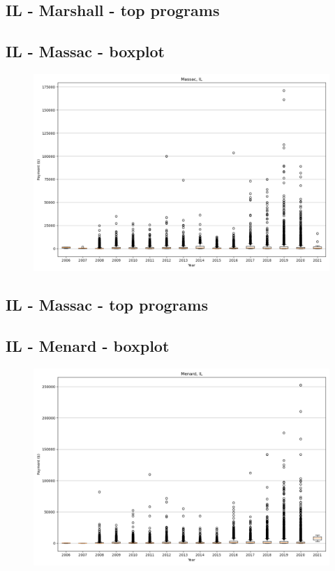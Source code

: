\subsection*{IL - Marshall - top programs}

\newpage
\subsection*{IL - Massac - boxplot}
\begin{figure}[h]
\centering
\includegraphics[width=7in]{../output/boxplots/counties/Massac-IL_boxplot.png}
\end{figure}


\subsection*{IL - Massac - top programs}

\newpage
\subsection*{IL - Menard - boxplot}
\begin{figure}[h]
\centering
\includegraphics[width=7in]{../output/boxplots/counties/Menard-IL_boxplot.png}
\end{figure}


